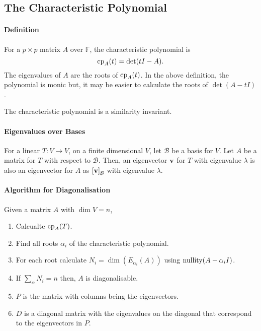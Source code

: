%
%
%
\subsection{The Characteristic Polynomial}

\paragraph{Definition}
For a \( p\times p \) matrix \( A \) over \( \mathbb{F} \), the characteristic
polynomial is \[
    \mathrm{cp}_A(t) = \det(tI - A).
\]
The eigenvalues of \( A \) are the roots of \( \mathrm{cp}_A(t) \).
In the above definition, the polynomial is monic but, it may be easier
to calculate the roots of \( \det(A - tI) \).

The characteristic polynomial is a similarity invariant.

\paragraph{Eigenvalues over Bases}
For a linear \( T: V \to V \), on a finite dimensional \( V \),
let \( \mathcal{B} \) be a basis for \( V \).
Let \( A \) be a matrix for \( T \) with respect to \( \mathcal{B} \).
Then, an eigenvector \( \mathbf{v} \) for \( T \) with eigenvalue \( \lambda \)
is also an eigenvector for \( A \)
as \( {[\mathbf{v}]}_\mathcal{B} \) with eigenvalue \( \lambda \).

\paragraph{Algorithm for Diagonalisation}
Given a matrix \( A \) with \( \dim V = n \),
\begin{enumerate}
    \item Calcualte \( \mathrm{cp}_A(T) \).
    \item Find all roots \( \alpha_i \) of the characteristic polynomial.
    \item For each root calculate \( N_i = \dim(E_{\alpha_i}(A) ) \) using
    \( \mathrm{nullity}(A - \alpha_i I) \).
    \item If \( \sum_{\alpha} N_i = n \) then, \( A \) is diagonalisable.
    \item \( P \) is the matrix with columns being the eigenvectors.
    \item \( D \) is a diagonal matrix with the eigenvalues on the diagonal
        that correspond to the eigenvectors in \( P \).
\end{enumerate}

